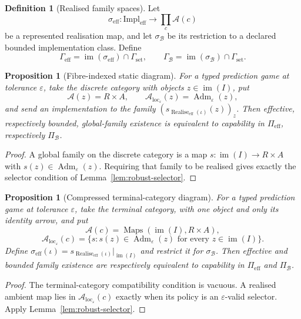 \documentclass[11pt]{article}
\theoremstyle{plain}
\newtheorem{proposition}[theorem]{Proposition}
\theoremstyle{definition}
\newtheorem{definition}[theorem]{Definition}
\theoremstyle{remark}
\newcommand{\im}{\operatorname{im}}
\newcommand{\Adm}{\operatorname{Adm}}
\newcommand{\realise}{\operatorname{Realise}}
\newcommand{\LocalAdm}{\mathcal{A}_{\mathrm{loc}}}
\newcommand{\eps}{\varepsilon}
\begin{document}
\begin{definition}[Realised family spaces]\label{def:ECD}
Let
\[
\sigma_{\mathrm{eff}}:\mathrm{Impl}_{\mathrm{eff}}
\to\prod_c\mathcal A(c)
\]
be a represented realisation map, and let $\sigma_{\mathcal B}$ be its
restriction to a declared bounded implementation class. Define
\[
\Gamma_{\mathrm{eff}}
=\im(\sigma_{\mathrm{eff}})\cap\Gamma_{\mathrm{set}},
\qquad
\Gamma_{\mathcal B}
=\im(\sigma_{\mathcal B})\cap\Gamma_{\mathrm{set}}.
\]
\end{definition}



\begin{proposition}[Fibre-indexed static diagram]\label{prop:fibre-diagram}
For a typed prediction game at tolerance $\eps$, take the discrete category with
objects $z\in\im(I)$, put
\[
\mathcal A(z)=R\times A,
\qquad
\LocalAdm_\eps(z)=\Adm_\eps(z),
\]
and send an implementation to the family
$(s_{\realise_{\mathrm{eff}}(\iota)}(z))_z$. Then effective, respectively
bounded, global-family existence is equivalent to capability in
$\Pi_{\mathrm{eff}}$, respectively $\Pi_{\mathcal B}$.
\end{proposition}

\begin{proof}
A global family on the discrete category is a map
$s:\im(I)\to R\times A$ with $s(z)\in\Adm_\eps(z)$. Requiring that family to be
realised gives exactly the selector condition of
Lemma~\ref{lem:robust-selector}.
\end{proof}

\begin{proposition}[Compressed terminal-category diagram]\label{prop:reduction}
For a typed prediction game at tolerance $\eps$, take the terminal category, with one object and only its identity arrow, and
put
\[
\mathcal A(c)=\operatorname{Maps}(\im(I),R\times A),
\]
\[
\LocalAdm_\eps(c)=
\{s:s(z)\in\Adm_\eps(z)\text{ for every }z\in\im(I)\}.
\]
Define
$\sigma_{\mathrm{eff}}(\iota)=
s_{\realise_{\mathrm{eff}}(\iota)}|_{\im(I)}$ and restrict it for
$\sigma_{\mathcal B}$. Then effective and bounded family existence are
respectively equivalent to capability in $\Pi_{\mathrm{eff}}$ and
$\Pi_{\mathcal B}$.
\end{proposition}

\begin{proof}
The terminal-category compatibility condition is vacuous. A realised ambient map lies
in $\LocalAdm_\eps(c)$ exactly when its policy is an $\eps$-valid selector.
Apply Lemma~\ref{lem:robust-selector}.
\end{proof}
\end{document}
